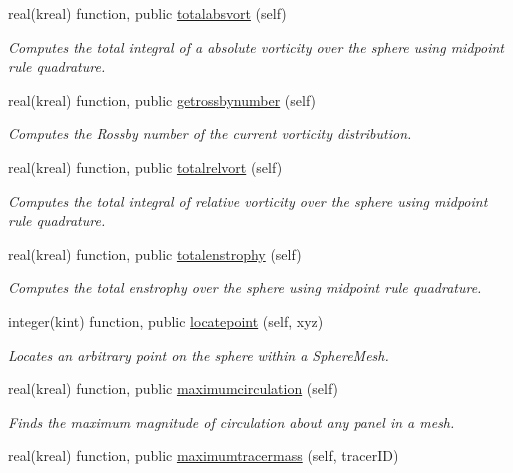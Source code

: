 \begin{DoxyCompactItemize}
real(kreal) function, public \hyperlink{group__SphereMesh_ga73b1f415fd585597ed3d213632cbf8d9}{totalabsvort} (self)
\begin{DoxyCompactList}\small\item\em Computes the total integral of a absolute vorticity over the sphere using midpoint rule quadrature. \end{DoxyCompactList}\item 
real(kreal) function, public \hyperlink{group__SphereMesh_ga328b7708b010b001ba36e802abb3c863}{getrossbynumber} (self)
\begin{DoxyCompactList}\small\item\em Computes the Rossby number of the current vorticity distribution. \end{DoxyCompactList}\item 
real(kreal) function, public \hyperlink{group__SphereMesh_gabe01464cd105cc5c2f2d2c577bb3eea2}{totalrelvort} (self)
\begin{DoxyCompactList}\small\item\em Computes the total integral of relative vorticity over the sphere using midpoint rule quadrature. \end{DoxyCompactList}\item 
real(kreal) function, public \hyperlink{group__SphereMesh_ga3bbd7e4f63fe3cffaff0220681c612d4}{totalenstrophy} (self)
\begin{DoxyCompactList}\small\item\em Computes the total enstrophy over the sphere using midpoint rule quadrature. \end{DoxyCompactList}\item 
integer(kint) function, public \hyperlink{group__SphereMesh_ga7d024751a0858a280b313d29f360c973}{locatepoint} (self, xyz)
\begin{DoxyCompactList}\small\item\em Locates an arbitrary point on the sphere within a Sphere\+Mesh. \end{DoxyCompactList}\item 
real(kreal) function, public \hyperlink{group__SphereMesh_ga6686ad6af0289f6a4fb2fc33c8aaaec0}{maximumcirculation} (self)
\begin{DoxyCompactList}\small\item\em Finds the maximum magnitude of circulation about any panel in a mesh. \end{DoxyCompactList}\item 
real(kreal) function, public \hyperlink{group__SphereMesh_ga5e91a046c4930eb535d416ecd186d642}{maximumtracermass} (self, tracer\+I\+D)

\end{DoxyCompactItemize}
